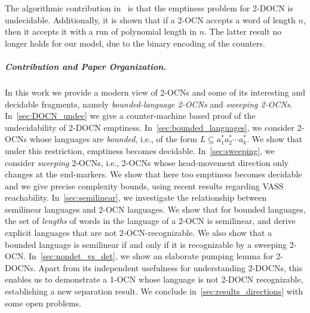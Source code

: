 \documentclass[11pt,a4paper]{amsart}
\theoremstyle{definition}
\begin{document}
	The algorithmic contribution in~\cite{chan1987two} is that the emptiness problem for 2-DOCN is undecidable. Additionally, it is shown that if a 2-OCN accepts a word of length $n$, then it accepts it with a run of polynomial length in $n$. The latter result no longer holds for our model, due to the binary encoding of the counters.
	
	
	\subparagraph*{Contribution and Paper Organization.}  In this work we
	provide a modern view of 2-OCNs and some of its interesting and decidable
	fragments, namely \emph{bounded-language 2-OCNs} and \emph{sweeping
		2-OCNs}. In~\cref{sec:DOCN_undec} we give a counter-machine based proof of the
	undecidability of 2-DOCN emptiness.  In~\cref{sec:bounded_languages}, we
	consider 2-OCNs whose languages are \emph{bounded}, i.e., of the form
	$L\subseteq a_1^*a_2^*\cdots a_k^*$.  We show that under this restriction, emptiness becomes
	decidable. In~\cref{sec:sweeping}, we consider \emph{sweeping} 2-OCNs, i.e.,
	2-OCNs whose head-movement direction only changes at the end-markers.  We show
	that here too emptiness becomes decidable and we give precise complexity bounds,
	using recent results regarding VASS reachability.  In~\cref{sec:semilinear}, we
	investigate the relationship between semilinear languages and 2-OCN
	languages. We show that for bounded languages, the set of \emph{lengths} of
	words in the language of a 2-OCN is semilinear, and derive explicit languages
	that are not 2-OCN-recognizable.  We also show that a bounded language is
	semilinear if and only if it is recognizable by a sweeping 2-OCN.
	In~\cref{sec:nondet_vs_det}, we show an elaborate pumping lemma for
	2-DOCNs. Apart from its independent usefulness for understanding 2-DOCNs, this
	enables us to demonstrate a 1-OCN whose language is not 2-DOCN recognizable,
	establishing a new separation result.  We conclude
	in~\cref{sec:results_directions} with some open problems.
	
\end{document}
